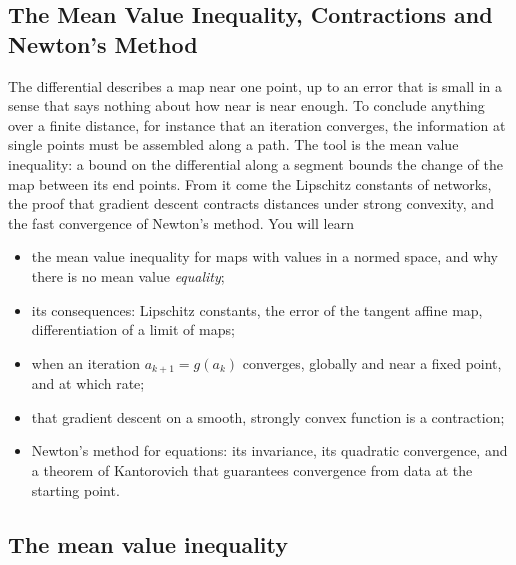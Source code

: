 \begin{notechapter}
\chapter{The Mean Value Inequality, Contractions and Newton's Method}
\label{ch:contractions-newton}

\begin{chapterintro}
The differential describes a map near one point, up to an error that is
small in a sense that says nothing about how near is near enough. To
conclude anything over a finite distance, for instance that an iteration
converges, the information at single points must be assembled along a
path. The tool is the mean value inequality: a bound on the differential
along a segment bounds the change of the map between its end points. From
it come the Lipschitz constants of networks, the proof that gradient
descent contracts distances under strong convexity, and the fast
convergence of Newton's method. You will learn
\begin{itemize}[nosep]
  \item the mean value inequality for maps with values in a normed space,
        and why there is no mean value \emph{equality};
  \item its consequences: Lipschitz constants, the error of the tangent
        affine map, differentiation of a limit of maps;
  \item when an iteration $a_{k+1} = g(a_k)$ converges, globally and near
        a fixed point, and at which rate;
  \item that gradient descent on a smooth, strongly convex function is a
        contraction;
  \item Newton's method for equations: its invariance, its quadratic
        convergence, and a theorem of Kantorovich that guarantees
        convergence from data at the starting point.
\end{itemize}
\end{chapterintro}

\section{The mean value inequality}\label{contractions-newton:sec:mvi}


\end{notechapter}
